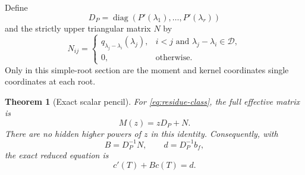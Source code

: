 \documentclass[11pt,a4paper]{article}
\numberwithin{equation}{section}
\newtheorem{theorem}{Theorem}[section]
\theoremstyle{definition}
\theoremstyle{remark}
\theoremstyle{definition}
\newcommand{\diag}{\operatorname{diag}}
\begin{document}
Define
\begin{equation}
 D_P=\diag(P'(\lambda_1),\ldots,P'(\lambda_r))
 \label{eq:DP}
\end{equation}
and the strictly upper triangular matrix $N$ by
\begin{equation}
 N_{ij}=
 \begin{cases}
 q_{\lambda_j-\lambda_i}(\lambda_j),
 &i<j\text{ and }\lambda_j-\lambda_i\in\mathcal D,\\
 0,&\text{otherwise}.
 \end{cases}
 \label{eq:Nentries}
\end{equation}
Only in this simple-root section are the moment and kernel coordinates single coordinates at each root.

\begin{theorem}[Exact scalar pencil]
\label{thm:pencil}
For \eqref{eq:residue-class}, the full effective matrix is
\begin{equation}
 M(z)=zD_P+N.
 \label{eq:exact-pencil}
\end{equation}
There are no hidden higher powers of $z$ in this identity. Consequently, with
\begin{equation}
 B=D_P^{-1}N,\qquad d=D_P^{-1}b_f,
 \label{eq:Bnormalize}
\end{equation}
the exact reduced equation is
\begin{equation}
 c'(T)+Bc(T)=d.
 \label{eq:nilpotent-ODE}
\end{equation}
\end{theorem}
\end{document}
